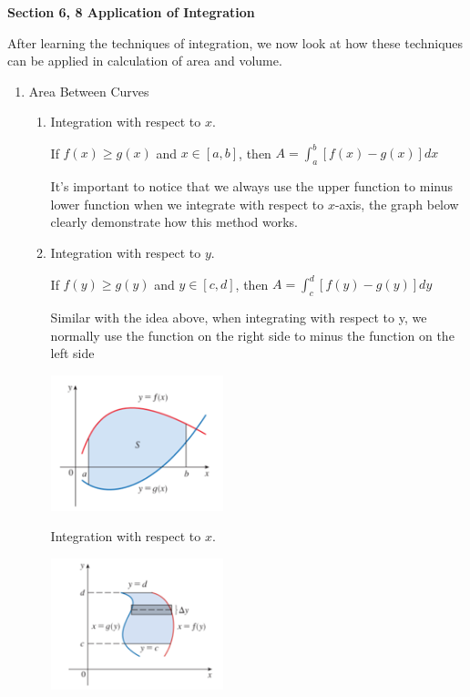 \documentclass[12px]{article}
\begin{document}
\begin{center}
    \Large\textbf{Section 6, 8 Application of Integration}
\end{center}
\hspace*{2em}After learning the techniques of integration, we now look at how these techniques can be applied in calculation of area and volume.
\begin{enumerate}
    \item Area Between Curves
    \begin{enumerate}[(1)]
        \item Integration with respect to $x$.
        \begin{center}
            If $f(x)\geq g(x)$ and $x\in[a,b]$, then $A=\displaystyle\int_a^b[f(x)-g(x)]dx$
        \end{center}
        \hspace*{2em}It's important to notice that we always use the upper function to minus lower function when we integrate with respect to $x$-axis, the graph below clearly demonstrate how this method works.
        \item Integration with respect to $y$.
        \begin{center}
            If $f(y)\geq g(y)$ and $y\in[c,d]$, then $A=\displaystyle\int_c^d[f(y)-g(y)]dy$
        \end{center}
        \hspace*{2em}Similar with the idea above, when integrating with respect to y, we normally use the function on the right side to minus the function on the left side
        \begin{center}
            \begin{multicols}{2}
                \includegraphics[width=5cm]{area x.png}
                \begin{center}
                    Integration with respect to $x$.
                \end{center}
                \includegraphics[width=5cm]{area y.png}

\end{multicols}
\end{center}
\end{enumerate}
\end{enumerate}
\end{document}
